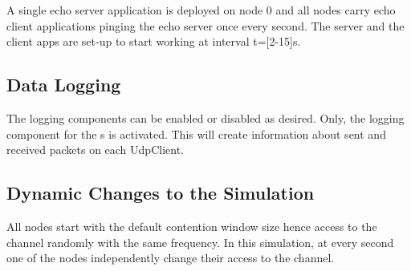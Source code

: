 A single echo server application is deployed on node 0 and all nodes carry echo client applications pinging the echo server once every second. The server and the client apps are set-up to start working at interval t=[2-15]s.

\subsection{Data Logging}
The logging components can be enabled or disabled as desired. Only, the logging component for the s is activated. This will create information about sent and received packets on each UdpClient. 

\subsection{Dynamic Changes to the Simulation}

All nodes start with the default contention window size hence access to the channel randomly with the same frequency. In this simulation, at every second one of the nodes independently change their access to the channel. 
